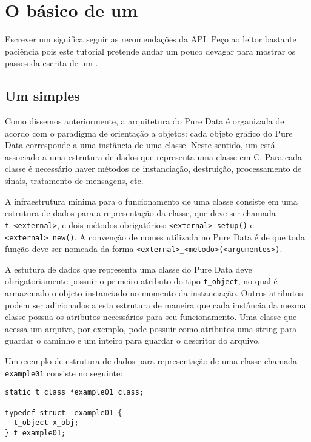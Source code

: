 
\chapter{O básico de um \external}

Escrever um \external significa seguir as recomendações da API. Peço ao leitor
bastante paciência pois este tutorial pretende andar um pouco devagar para
mostrar os passos da escrita de um \external.

\section{Um \external simples}

Como dissemos anteriormente, a arquitetura do Pure Data é organizada de acordo
com o paradigma de orientação a objetos: cada objeto gráfico do Pure Data
corresponde a uma instância de uma classe. Neste sentido, um \external está
associado a uma estrutura de dados que representa uma classe em C. Para cada
classe é necessário haver métodos de instanciação, destruição, processamento
de sinais, tratamento de mensagens, etc.

A infraestrutura mínima para o funcionamento de uma classe consiste em uma
estrutura de dados para a representação da classe, que deve ser chamada
\texttt{t\_<external>}, e dois métodos obrigatórios: \texttt{<external>\_setup()}
e \texttt{<external>\_new()}. A convenção de nomes utilizada no Pure Data é de
que toda função deve ser nomeada da forma
\texttt{<external>\_<metodo>(<argumentos>)}.

A estutura de dados que representa uma classe do Pure Data deve
obrigatoriamente possuir o primeiro atributo do tipo \texttt{t\_object}, no
qual é armazenado o objeto instanciado no momento da instanciação.  Outros
atributos podem ser adicionados a esta estrutura de maneira que cada instância
da mesma classe possua os atributos necessários para seu funcionamento. Uma
classe que acessa um arquivo, por exemplo, pode possuir como atributos uma
string para guardar o caminho e um inteiro para guardar o descritor do
arquivo.

Um exemplo de estrutura de dados para representação de uma classe chamada
\texttt{example01} consiste no seguinte:

\vspace{1em}
\begin{lstlisting}
static t_class *example01_class;

typedef struct _example01 {
  t_object x_obj;
} t_example01;
\end{lstlisting}

